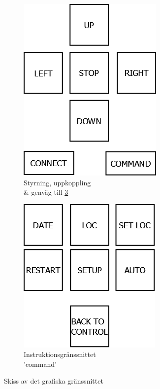 \documentclass{article}
\begin{document}
        \begin{figure}[b!]
            \centering
            \begin{subfigure}[b]{0.4\textwidth}
                \centering
                \includegraphics[scale=0.3]{img/styrkors}
                \caption{Styrning, uppkoppling \\ \& genväg till \ref{fig:command}}
                \label{fig:cross}
            \end{subfigure}
            \begin{subfigure}[b]{0.4\textwidth}
                \centering
                \includegraphics[scale=0.3]{img/command}
                \caption{Instruktionsgränssnittet \\ 'command'}
                \label{fig:command}
            \end{subfigure}
            \caption{Skiss av det grafiska gränssnittet}
        \end{figure}
\end{document}
